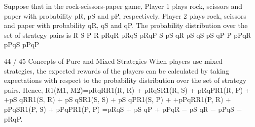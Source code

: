 \documentclass[]{report}
\begin{document}
Suppose that in the rock-scissors-paper game, Player 1 plays rock,
scissors and paper with probability pR, pS and pP, respectively.
Player 2 plays rock, scissors and paper with probability qR, qS and
qP. The probability distribution over the set of strategy pairs is
R S P
R pRqR pRqS pRqP
S pS qR pS qS pS qP
P pPqR pPqS pPqP

44 / 45
Concepts of Pure and Mixed Strategies
When players use mixed strategies, the expected rewards of the
players can be calculated by taking expectations with respect to
the probability distribution over the set of strategy pairs. Hence,
R1(M1, M2)=pRqRR1(R, R) + pRqSR1(R, S) + pRqPR1(R, P) +
+pS qRR1(S, R) + pS qSR1(S, S) + pS qPR1(S, P) +
+pPqRR1(P, R) + pPqSR1(P, S) + pPqPR1(P, P)
=pRqS + pS qP + pPqR − pS qR − pPqS − pRqP.
\end{document}
